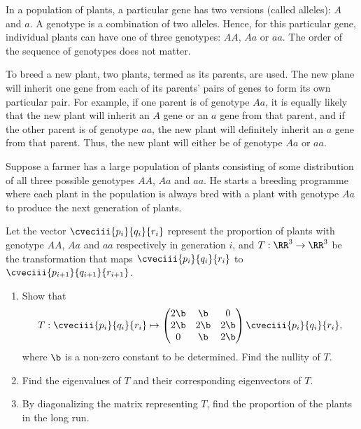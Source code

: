 \begin{problem}
    In a population of plants, a particular gene has two versions (called alleles): $A$ and $a$. A genotype is a combination of two alleles. Hence, for this particular gene, individual plants can have one of three genotypes: $AA$, $Aa$ or $aa$. The order of the sequence of genotypes does not matter.

    To breed a new plant, two plants, termed as its parents, are used. The new plane will inherit one gene from each of its parents' pairs of genes to form its own particular pair. For example, if one parent is of genotype $Aa$, it is equally likely that the new plant will inherit an $A$ gene or an $a$ gene from that parent, and if the other parent is of genotype $aa$, the new plant will definitely inherit an $a$ gene from that parent. Thus, the new plant will either be of genotype $Aa$ or $aa$.

    Suppose a farmer has a large population of plants consisting of some distribution of all three possible genotypes $AA$, $Aa$ and $aa$. He starts a breeding programme where each plant in the population is always bred with a plant with genotype $Aa$ to produce the next generation of plants.

    Let the vector $\cveciii{p_i}{q_i}{r_i}$ represent the proportion of plants with genotype $AA$, $Aa$ and $aa$ respectively in generation $i$, and $T : \RR^3 \to \RR^3$ be the transformation that maps $\cveciii{p_i}{q_i}{r_i}$ to $\cveciii{p_{i+1}}{q_{i+1}}{r_{i+1}}$.

    \begin{enumerate}
        \item Show that \[T: \cveciii{p_i}{q_i}{r_i} \mapsto \begin{pmatrix}2\b & \b & 0 \\ 2\b & 2\b & 2\b \\ 0 & \b & 2\b\end{pmatrix} \cveciii{p_i}{q_i}{r_i},\] where $\b$ is a non-zero constant to be determined. Find the nullity of $T$.
        \item Find the eigenvalues of $T$ and their corresponding eigenvectors of $T$.
        \item By diagonalizing the matrix representing $T$, find the proportion of the plants in the long run.
    \end{enumerate}
\end{problem}

